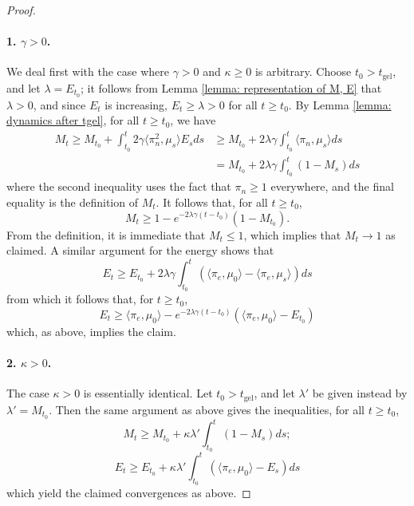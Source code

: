 \documentclass[11pt, notitlepage]{article}
\begin{document}
\begin{proof}
\paragraph{1. ${\gamma>0}$.} We deal first with the case where $\gamma>0$ and $\kappa \ge 0$ is arbitrary. Choose $t_0>t_\text{gel}$, and let $\lambda=E_{t_0}$; it follows from Lemma \ref{lemma: representation of M, E} that $\lambda>0$, and since $E_t$ is increasing, $E_t\ge \lambda>0$ for all $t\ge t_0$. By Lemma \ref{lemma: dynamics after tgel}, for all $t\ge t_0$, we have \begin{equation} \begin{split} M_t\ge M_{t_0}+\int_{t_0}^t 2\gamma \langle \pi_n^2, \mu_s\rangle E_s ds & \ge M_{t_0}+2\lambda \gamma \int_{t_0}^t \langle \pi_n, \mu_s\rangle ds \\ & = M_{t_0}+2\lambda \gamma \int_{t_0}^t (1-M_s)ds\end{split}  \end{equation} where the second inequality uses the fact that $\pi_n \ge 1$ everywhere, and the final equality is the definition of $M_t$. It follows that, for all $t\ge t_0$, \begin{equation} M_t \ge 1-e^{-2\lambda \gamma (t-t_0)}(1-M_{t_0}). \end{equation} From the definition, it is immediate that $M_t\le 1$, which implies that $M_t\rightarrow 1$ as claimed. A similar argument for the energy shows that \begin{equation} E_t \ge E_{t_0} + 2\lambda \gamma  \int_{t_0}^t(\langle \pi_e, \mu_0\rangle -\langle \pi_e, \mu_s\rangle)ds\end{equation} from which it follows that, for $t\ge t_0$, \begin{equation} E_t\ge \langle \pi_e, \mu_0\rangle-e^{-2\lambda\gamma(t-t_0)}(\langle \pi_e, \mu_0\rangle - E_{t_0})  \end{equation}  which, as above, implies the claim.
\paragraph{2. ${\kappa>0}$.} The case $\kappa>0$ is essentially identical. Let $t_0>t_\text{gel}$,  and let $\lambda'$ be given instead by $\lambda'=M_{t_0}$. Then the same argument as above gives the inequalities, for all $t\ge t_0$, \begin{equation} M_t \ge M_{t_0}+\kappa \lambda'\int_{t_0}^t (1-M_s)ds; \end{equation} \begin{equation}  E_t \ge E_{t_0}+\kappa \lambda'\int_{t_0}^t (\langle \pi_e, \mu_0\rangle-E_s)ds \end{equation} which yield the claimed convergences as above. \end{proof} 
\end{document}
